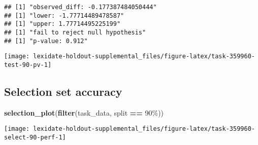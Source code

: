 \documentclass[
]{book}
\newenvironment{Shaded}{\begin{snugshade}}{\end{snugshade}}
\newcommand{\AttributeTok}[1]{\textcolor[rgb]{0.13,0.29,0.53}{#1}}
\newcommand{\DecValTok}[1]{\textcolor[rgb]{0.00,0.00,0.81}{#1}}
\newcommand{\FunctionTok}[1]{\textcolor[rgb]{0.13,0.29,0.53}{\textbf{#1}}}
\newcommand{\NormalTok}[1]{#1}
\newcommand{\OtherTok}[1]{\textcolor[rgb]{0.56,0.35,0.01}{#1}}
\newcommand{\SpecialCharTok}[1]{\textcolor[rgb]{0.81,0.36,0.00}{\textbf{#1}}}
\newcommand{\StringTok}[1]{\textcolor[rgb]{0.31,0.60,0.02}{#1}}
\begin{document}
\begin{Shaded}
\end{Shaded}

\begin{verbatim}
## [1] "observed_diff: -0.177387484050444"
## [1] "lower: -1.77714489478587"
## [1] "upper: 1.77714495225199"
## [1] "fail to reject null hypothesis"
## [1] "p-value: 0.912"
\end{verbatim}

\texttt{[image: lexidate-holdout-supplemental\_files/figure-latex/task-359960-test-90-pv-1]}

\hypertarget{selection-set-accuracy-48}{%
\subsection{Selection set accuracy}\label{selection-set-accuracy-48}}

\begin{Shaded}
\begin{Highlighting}[]
\FunctionTok{selection\_plot}\NormalTok{(}\FunctionTok{filter}\NormalTok{(task\_data, split }\SpecialCharTok{==} \StringTok{\textquotesingle{}90\%\textquotesingle{}}\NormalTok{))}
\end{Highlighting}
\end{Shaded}

\texttt{[image: lexidate-holdout-supplemental\_files/figure-latex/task-359960-select-90-perf-1]}
\end{document}
